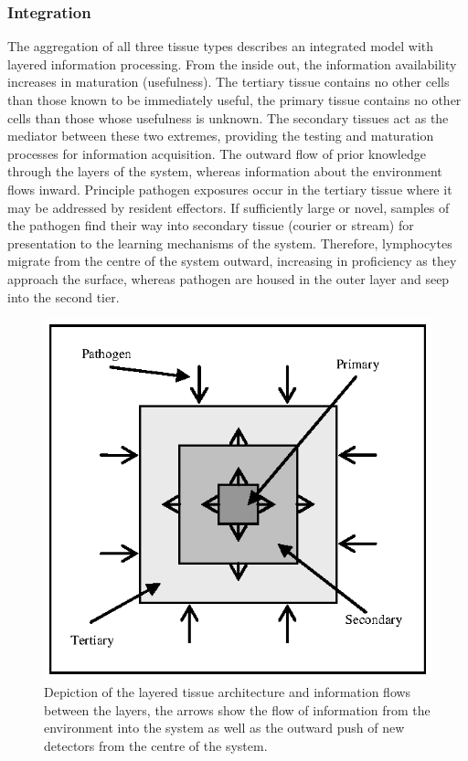%
%
\subsubsection{Integration}
The aggregation of all three tissue types describes an integrated model with layered information processing. From the inside out, the information availability increases in maturation (usefulness). The tertiary tissue contains no other cells than those known to be immediately useful, the primary tissue contains no other cells than those whose usefulness is unknown. The secondary tissues act as the mediator between these two extremes, providing the testing and maturation processes for information acquisition. The outward flow of prior knowledge through the layers of the system, whereas information about the environment flows inward. Principle pathogen exposures occur in the tertiary tissue where it may be addressed by resident effectors. If sufficiently large or novel, samples of the pathogen find their way into secondary tissue (courier or stream) for presentation to the learning mechanisms of the system. Therefore, lymphocytes migrate from the centre of the system outward, increasing in proficiency as they approach the surface, whereas pathogen are housed in the outer layer and seep into the second tier.

\begin{figure}[ht]
	\centering
		\includegraphics[scale=0.75]{Tissues/tissues-models-flows}
	\caption{Depiction of the layered tissue architecture and information flows between the layers, the arrows show the flow of information from the environment into the system as well as the outward push of new detectors from the centre of the system.}
	\label{fig:tissues:architecture:flows}
\end{figure}

